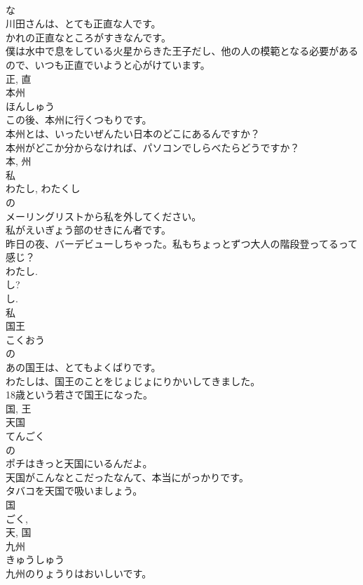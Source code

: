 \documentclass[8pt]{extreport}
\begin{document}
\begin{CJK}{UTF8}{min}
\\	な 
\\	川田さんは、とても正直な人です。	
\\	かれの正直なところがすきなんです。	
\\	僕は水中で息をしている火星からきた王子だし、他の人の模範となる必要があるので、いつも正直でいようと心がけています。	
\\	正, 直	
\\	本州	
\\	ほんしゅう	
\\	この後、本州に行くつもりです。	
\\	本州とは、いったいぜんたい日本のどこにあるんですか？	
\\	本州がどこか分からなければ、パソコンでしらべたらどうですか？	
\\	本, 州	
\\	私	
\\	わたし, わたくし	
\\	の 
\\	メーリングリストから私を外してください。	
\\	私がえいぎょう部のせきにん者です。	
\\	昨日の夜、バーデビューしちゃった。私もちょっとずつ大人の階段登ってるって感じ？	
\\	わたし. 
\\	し?
\\	し.
\\	私	
\\	国王	
\\	こくおう	
\\	の 
\\	あの国王は、とてもよくばりです。	
\\	わたしは、国王のことをじょじょにりかいしてきました。	
\\	18歳という若さで国王になった。	
\\	国, 王	
\\	天国	
\\	てんごく	
\\	の 
\\	ポチはきっと天国にいるんだよ。	
\\	天国がこんなとこだったなんて、本当にがっかりです。	
\\	タバコを天国で吸いましょう。	
\\	国 
\\	ごく, 
\\	天, 国	
\\	九州	
\\	きゅうしゅう	
\\	九州のりょうりはおいしいです。	

\end{CJK}
\end{document}
